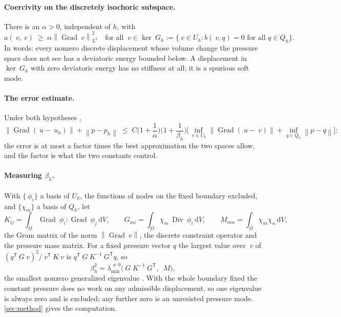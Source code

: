 \documentclass{article}
\newcommand{\Grad}{\operatorname{Grad}}
\newcommand{\Div}{\operatorname{Div}}
\newcommand{\transpose}[1]{#1^{\mathsf{T}}}
\newcommand{\norm}[1]{\left\lVert #1 \right\rVert}
\newcommand{\diff}{\,\mathrm{d}}
\theoremstyle{definition}
\theoremstyle{plain}
\begin{document}
\paragraph{Coercivity on the discretely isochoric subspace.} There is an
$\alpha > 0$, independent of $h$, with
\begin{equation}
  \label{eq:coercive-background}
  a(~v, ~v) \;\ge\; \alpha \norm{\Grad ~v}_{L^2}^2
  \quad \text{for all } ~v \in \ker ~G_h := \{ ~v \in U_h : b(~v, q) = 0
  \text{ for all } q \in Q_h \} .
\end{equation}
In words: every nonzero discrete displacement whose volume change the
pressure space does not see has a deviatoric energy bounded below. A
displacement in $\ker ~G_h$ with zero deviatoric energy has no stiffness at
all; it is a spurious soft mode.

\paragraph{The error estimate.} Under both hypotheses
\cite[Theorem~5.2.2]{BoffiBrezziFortin:2013},
\begin{equation}
  \label{eq:brezzi-estimate}
  \norm{\Grad(~u - ~u_h)} + \norm{p - p_h}
  \;\le\; C \Big(1 + \frac{1}{\alpha}\Big)\Big(1 + \frac{1}{\beta_h}\Big)
  \Big[ \inf_{~v \in U_h} \norm{\Grad(~u - ~v)} + \inf_{q \in Q_h} \norm{p - q} \Big] :
\end{equation}
the error is at most a factor times the best approximation the two spaces
allow, and the factor is what the two constants control.

\paragraph{Measuring $\beta_h$.} With $\{~\phi_i\}$ a basis of $U_h$, the
functions of nodes on the fixed boundary excluded, and $\{\chi_m\}$ a basis
of $Q_h$, let
\begin{equation}
  \label{eq:betamatrices}
  K_{ij} = \int_\Omega \Grad~\phi_i : \Grad~\phi_j \diff V, \qquad
  G_{mi} = \int_\Omega \chi_m \, \Div ~\phi_i \diff V, \qquad
  M_{mn} = \int_\Omega \chi_m \chi_n \diff V ,
\end{equation}
the Gram matrix of the norm $\norm{\Grad ~v}$, the discrete constraint
operator and the pressure mass matrix. For a fixed pressure vector $q$ the
largest value over $~v$ of $(\transpose{q} ~G ~v)^2 / \transpose{~v} ~K ~v$
is $\transpose{q} ~G ~K^{-1} \transpose{~G} q$, so
\begin{equation}
  \label{eq:betaeig}
  \beta_h^2 = \lambda_{\min}^{\neq 0}\big( ~G ~K^{-1} \transpose{~G},\; ~M \big) ,
\end{equation}
the smallest nonzero generalized eigenvalue \cite{ChapelleBathe:1993}. With
the whole boundary fixed the constant pressure does no work on any
admissible displacement, so one eigenvalue is always zero and is excluded;
any further zero is an unresisted pressure mode. \cref{sec:method} gives
the computation.
\end{document}
